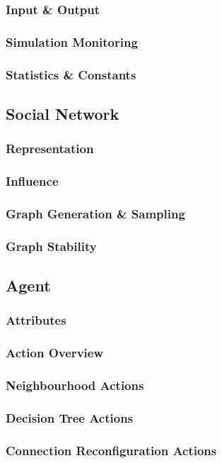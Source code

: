 \documentclass[]{report}
\begin{document}
\subsubsection{Input \& Output}
\subsubsection{Simulation Monitoring}
\subsubsection{Statistics \& Constants}

\subsection{Social Network}
\subsubsection{Representation}
\subsubsection{Influence}
\subsubsection{Graph Generation \& Sampling}
\subsubsection{Graph Stability}

\subsection{Agent}
\subsubsection{Attributes}
\subsubsection{Action Overview}
\subsubsection{Neighbourhood Actions}
\subsubsection{Decision Tree Actions}
\subsubsection{Connection Reconfiguration Actions}
\end{document}
